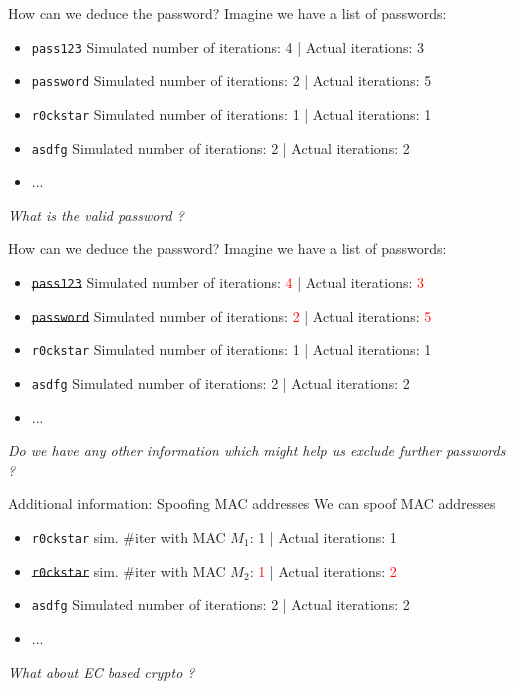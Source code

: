 \documentclass[xcolor=table]{bredelebeamer}
\begin{document}
\begin{frame}{How can we deduce the password?}
    Imagine we have a list of passwords:

    \begin{itemize}
        \item \texttt{pass123} \hfill Simulated number of iterations: 4 | Actual iterations: 3
        \item \texttt{password} \hfill Simulated number of iterations: 2 | Actual iterations: 5
        \item \texttt{r0ckstar} \hfill Simulated number of iterations: 1 | Actual iterations: 1
        \item \texttt{asdfg} \hfill Simulated number of iterations: 2 | Actual iterations: 2
        \item ...
    \end{itemize}
    \vspace{30pt}
    \textit{ \Large{What is the valid password ?}}
\end{frame}
\begin{frame}{How can we deduce the password?}
    Imagine we have a list of passwords:

    \begin{itemize}
        \item \st{\texttt{pass123}} \hfill Simulated number of iterations: \textcolor{red}{4} | Actual iterations: \textcolor{red}{3}
        \item \st{\texttt{password}} \hfill Simulated number of iterations: \textcolor{red}{2} | Actual iterations: \textcolor{red}{5}
        \item \texttt{r0ckstar} \hfill Simulated number of iterations: 1 | Actual iterations: 1
        \item \texttt{asdfg} \hfill Simulated number of iterations: 2 | Actual iterations: 2
        \item ...
    \end{itemize}
        \vspace{30pt}
        \textit{ \Large{Do we have any other information which might help us exclude further passwords ?}}
\end{frame}
\begin{frame}{Additional information: Spoofing MAC addresses}
    \exampleCodeB
    We can spoof MAC addresses
    \begin{itemize}
        \item \texttt{r0ckstar} \hfill sim. #iter with MAC $M_1$: 1 | Actual iterations: 1
        \item \st{\texttt{r0ckstar}} \hfill sim. #iter with MAC $M_2$: \textcolor{red}{1} | Actual iterations: \textcolor{red}{2}

        \item \texttt{asdfg} \hfill Simulated number of iterations: 2 | Actual iterations: 2
        \item ...
    \end{itemize}
        \vspace{30pt}
        \textit{ \Large{What about EC based crypto ?}}
\end{frame}
\end{document}

